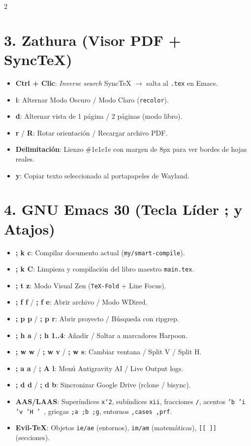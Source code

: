 \documentclass[11pt,article,spanish]{apuntes-scr}
\begin{document}
\begin{multicols*}{2}
  \section*{3. Zathura (Visor PDF + SyncTeX)}
  \begin{itemize}[leftmargin=*]
    \item \textbf{Ctrl + Clic}: \textit{Inverse search} SyncTeX $\to$ salta al \texttt{.tex} en Emacs.
    \item \textbf{i}: Alternar Modo Oscuro / Modo Claro (\texttt{recolor}).
    \item \textbf{d}: Alternar vista de 1 página / 2 páginas (modo libro).
    \item \textbf{r} / \textbf{R}: Rotar orientación / Recargar archivo PDF.
    \item \textbf{Delimitación}: Lienzo \#1e1e1e con margen de 8px para ver bordes de hojas reales.
    \item \textbf{y}: Copiar texto seleccionado al portapapeles de Wayland.
  \end{itemize}

  \section*{4. GNU Emacs 30 (Tecla Líder ; y Atajos)}
  \begin{itemize}[leftmargin=*]
    \item \textbf{; k c}: Compilar documento actual (\texttt{my/smart-compile}).
    \item \textbf{; k C}: Limpieza y compilación del libro maestro \texttt{main.tex}.
    \item \textbf{; t z}: Modo Visual Zen (\texttt{TeX-Fold} + Line Focus).
    \item \textbf{; f f} / \textbf{; f e}: Abrir archivo / Modo WDired.
    \item \textbf{; p p} / \textbf{; p r}: Abrir proyecto / Búsqueda con ripgrep.
    \item \textbf{; h a} / \textbf{; h 1..4}: Añadir / Saltar a marcadores Harpoon.
    \item \textbf{; w w} / \textbf{; w v} / \textbf{; w s}: Cambiar ventana / Split V / Split H.
    \item \textbf{; a a} / \textbf{; A l}: Menú Antigravity AI / Live Output logs.
    \item \textbf{; d d} / \textbf{; d b}: Sincronizar Google Drive (rclone / bisync).
    \item \textbf{AAS/LAAS}: Superíndices \texttt{x`2}, subíndices \texttt{xii}, fracciones \texttt{/}, acentos \texttt{'b 'i 'v 'H '~}, griegas \texttt{;a ;b ;g}, entornos \texttt{,cases ,prf}.
    \item \textbf{Evil-TeX}: Objetos \texttt{ie/ae} (entornos), \texttt{im/am} (matemáticas), \texttt{[[ ]]} (secciones).
  \end{itemize}


\end{multicols*}
\end{document}
